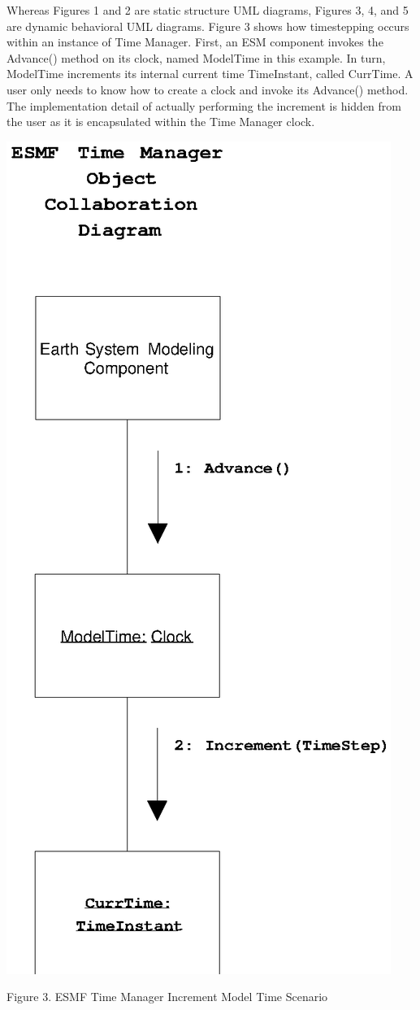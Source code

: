 

Whereas Figures 1 and 2 are static structure UML diagrams, Figures 3, 4,  and
5 are dynamic behavioral UML diagrams.  Figure 3 shows how timestepping occurs
within an instance of Time Manager.  First, an ESM component invokes the
Advance() method on its clock, named ModelTime in this example.  In turn,
ModelTime increments its internal current time TimeInstant, called CurrTime.
A user only needs to know how to create a clock and invoke its Advance()
method.  The implementation detail of actually performing the increment is
hidden from the user as it is encapsulated within the Time Manager clock.

\begin{center}
\includegraphics{TimeMgrOCD1.EPS}
   
Figure 3.  ESMF Time Manager Increment Model Time Scenario
   
\end{center}
